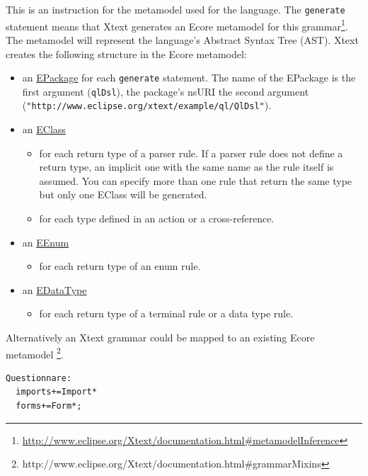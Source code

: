 This is an instruction for the metamodel used for the language. The
\texttt{generate} statement means that Xtext generates an Ecore metamodel for
this
grammar\footnote{\url{http://www.eclipse.org/Xtext/documentation.html#metamodelInference}}.
The metamodel will represent the language's Abstract Syntax Tree
(AST). Xtext creates the following structure in the Ecore metamodel:
\begin{itemize}
  \item an
  \href{http://download.eclipse.org/modeling/emf/emf/javadoc/2.7.0/org/eclipse/emf/ecore/EPackage.html}{EPackage}
  for each \texttt{generate} statement. The name of the EPackage is the first
  argument (\texttt{qlDsl}), the package's nsURI the second argument
  \newline(\texttt{"http://www.eclipse.org/xtext/example/ql/QlDsl"}).
  \item an
  \href{http://download.eclipse.org/modeling/emf/emf/javadoc/2.7.0/org/eclipse/emf/ecore/EClass.html}{EClass}
	\begin{itemize}
		\item for each return type of a parser rule. 
		If a parser rule does not define a return type, an implicit one with the same name as the rule itself is assumed. You can specify more than one rule that return the same type but only one EClass will be generated.
		\item for each type defined in an action or a cross-reference.
	\end{itemize}
  \item an
  \href{http://download.eclipse.org/modeling/emf/emf/javadoc/2.7.0/org/eclipse/emf/ecore/EEnum.html}{EEnum}
	\begin{itemize}
		\item for each return type of an enum rule. 
	\end{itemize}
  \item an
  \href{http://download.eclipse.org/modeling/emf/emf/javadoc/2.7.0/org/eclipse/emf/ecore/EDataType.html}{EDataType}
	\begin{itemize}
		\item for each return type of a terminal rule or a data type rule. 
	\end{itemize}
\end{itemize}

Alternatively an Xtext grammar could be mapped to an existing Ecore metamodel
\footnote{http://www.eclipse.org/Xtext/documentation.html#grammarMixins}.


\begin{lstlisting}[language=Xtext]
Questionnare:
  imports+=Import*
  forms+=Form*;
\end{lstlisting}

